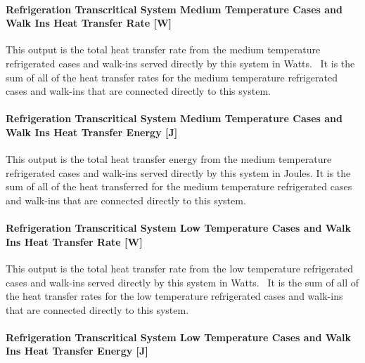 \paragraph{Refrigeration Transcritical System Medium Temperature Cases and Walk Ins Heat Transfer Rate {[}W{]}}\label{refrigeration-transcritical-system-medium-temperature-cases-and-walk-ins-heat-transfer-rate-w}

This output is the total heat transfer rate from the medium temperature refrigerated cases and walk-ins served directly by this system in Watts.~ It is the sum of all of the heat transfer rates for the medium temperature refrigerated cases and walk-ins that are connected directly to this system.

\paragraph{Refrigeration Transcritical System Medium Temperature Cases and Walk Ins Heat Transfer Energy {[}J{]}}\label{refrigeration-transcritical-system-medium-temperature-cases-and-walk-ins-heat-transfer-energy-j}

This output is the total heat transfer energy from the medium temperature refrigerated cases and walk-ins served directly by this system in Joules. It is the sum of all of the heat transferred for the medium temperature refrigerated cases and walk-ins that are connected directly to this system.

\paragraph{Refrigeration Transcritical System Low Temperature Cases and Walk Ins Heat Transfer Rate {[}W{]}}\label{refrigeration-transcritical-system-low-temperature-cases-and-walk-ins-heat-transfer-rate-w}

This output is the total heat transfer rate from the low temperature refrigerated cases and walk-ins served directly by this system in Watts.~ It is the sum of all of the heat transfer rates for the low temperature refrigerated cases and walk-ins that are connected directly to this system.

\paragraph{Refrigeration Transcritical System Low Temperature Cases and Walk Ins Heat Transfer Energy {[}J{]}}\label{refrigeration-transcritical-system-low-temperature-cases-and-walk-ins-heat-transfer-energy-j}

